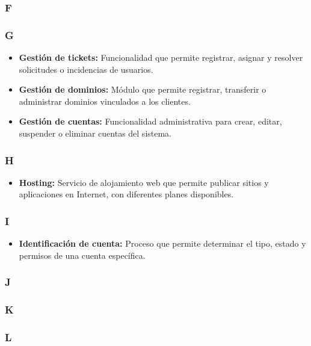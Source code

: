 \subsubsection*{F}

\subsubsection*{G}
\begin{itemize}
    \item \textbf{Gestión de tickets:} Funcionalidad que permite registrar, asignar y resolver solicitudes o incidencias de usuarios.
    \item \textbf{Gestión de dominios:} Módulo que permite registrar, transferir o administrar dominios vinculados a los clientes.
    \item \textbf{Gestión de cuentas:} Funcionalidad administrativa para crear, editar, suspender o eliminar cuentas del sistema.
\end{itemize}

\subsubsection*{H}
\begin{itemize}
\item \textbf {Hosting:} Servicio de alojamiento web que permite publicar sitios y aplicaciones en Internet, con diferentes planes disponibles.
\end{itemize}

\subsubsection*{I}
\begin{itemize}
    \item \textbf {Identificación de cuenta:} Proceso que permite determinar el tipo, estado y permisos de una cuenta específica.
\end{itemize}

\subsubsection*{J}

\subsubsection*{K}

\subsubsection*{L}

